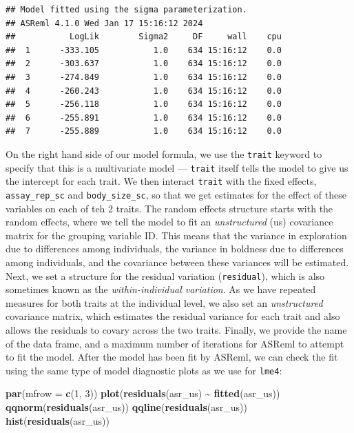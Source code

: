 \documentclass[
  12pt,
]{book}
\newenvironment{Shaded}{\begin{snugshade}}{\end{snugshade}}
\newcommand{\DataTypeTok}[1]{\textcolor[rgb]{0.13,0.29,0.53}{#1}}
\newcommand{\DecValTok}[1]{\textcolor[rgb]{0.00,0.00,0.81}{#1}}
\newcommand{\KeywordTok}[1]{\textcolor[rgb]{0.13,0.29,0.53}{\textbf{#1}}}
\newcommand{\NormalTok}[1]{#1}
\newcommand{\OperatorTok}[1]{\textcolor[rgb]{0.81,0.36,0.00}{\textbf{#1}}}
\newcommand{\StringTok}[1]{\textcolor[rgb]{0.31,0.60,0.02}{#1}}
\begin{document}
\begin{verbatim}
## Model fitted using the sigma parameterization.
## ASReml 4.1.0 Wed Jan 17 15:16:12 2024
##           LogLik        Sigma2     DF     wall    cpu
##  1      -333.105           1.0    634 15:16:12    0.0
##  2      -303.637           1.0    634 15:16:12    0.0
##  3      -274.849           1.0    634 15:16:12    0.0
##  4      -260.243           1.0    634 15:16:12    0.0
##  5      -256.118           1.0    634 15:16:12    0.0
##  6      -255.891           1.0    634 15:16:12    0.0
##  7      -255.889           1.0    634 15:16:12    0.0
\end{verbatim}

On the right hand side of our model formula, we use the \texttt{trait} keyword to specify that this is a multivariate model --- \texttt{trait} itself tells the model to give us the intercept for each trait. We then interact \texttt{trait} with the fixed effects, \texttt{assay\_rep\_sc} and \texttt{body\_size\_sc}, so that we get estimates for the effect of these variables on each of teh 2 traits.
The random effects structure starts with the random effects, where we tell the model to fit an \emph{unstructured} (us) covariance matrix for the grouping variable ID. This means that the variance in exploration due to differences among individuals, the variance in boldness due to differences among individuals, and the covariance between these variances will be estimated.
Next, we set a structure for the residual variation (\texttt{residual}), which is also sometimes known as the \emph{within-individual variation}. As we have repeated measures for both traits at the individual level, we also set an \emph{unstructured} covariance matrix, which estimates the residual variance for each trait and also allows the residuals
to covary across the two traits.
Finally, we provide the name of the data frame, and a maximum number of iterations for ASReml to attempt to fit the model.
After the model has been fit by ASReml, we can check the fit using the same type of model diagnostic plots as we use for \texttt{lme4}:

\begin{Shaded}
\begin{Highlighting}[]
\KeywordTok{par}\NormalTok{(}\DataTypeTok{mfrow =} \KeywordTok{c}\NormalTok{(}\DecValTok{1}\NormalTok{, }\DecValTok{3}\NormalTok{))}
\KeywordTok{plot}\NormalTok{(}\KeywordTok{residuals}\NormalTok{(asr\_us) }\OperatorTok{\textasciitilde{}}\StringTok{ }\KeywordTok{fitted}\NormalTok{(asr\_us))}
\KeywordTok{qqnorm}\NormalTok{(}\KeywordTok{residuals}\NormalTok{(asr\_us))}
\KeywordTok{qqline}\NormalTok{(}\KeywordTok{residuals}\NormalTok{(asr\_us))}
\KeywordTok{hist}\NormalTok{(}\KeywordTok{residuals}\NormalTok{(asr\_us))}
\end{Highlighting}
\end{Shaded}
\end{document}
